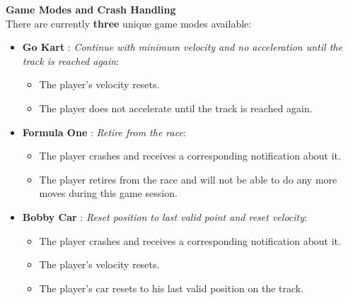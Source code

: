             \textbf{Game Modes and Crash Handling} \\
            There are currently \textbf{three} unique game modes available:
            \begin{itemize}
                \item \textbf{Go Kart} : \textit{Continue with minimum velocity and no acceleration until the track is reached again}:
                \begin{itemize}
                    \item The player's velocity resets.
                    \item The player does not accelerate until the track is reached again.
                \end{itemize}
                \item \textbf{Formula One} : \textit{Retire from the race}:
                \begin{itemize}
                    \item The player crashes and receives a corresponding notification about it.
                    \item The player retires from the race and will not be able to do any more moves during this game session.
                \end{itemize}
                \item \textbf{Bobby Car} : \textit{Reset position to last valid point and reset velocity}:
                \begin{itemize}
                    \item The player crashes and receives a corresponding notification about it.
                    \item The player's velocity resets.
                    \item The player's car resets to his last valid position on the track.
                \end{itemize}
            \end{itemize}

